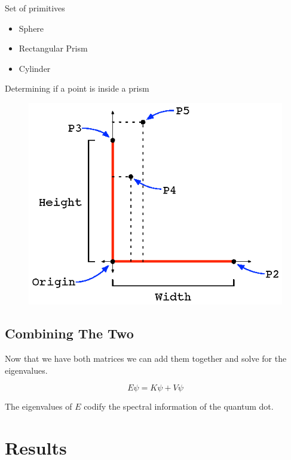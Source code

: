 \documentclass{beamer}
\begin{document}
\begin{frame}
  Set of primitives
    \begin{itemize}
      \item Sphere
      \item Rectangular Prism
      \item Cylinder
    \end{itemize}
\end{frame}

\begin{frame}
Determining if a point is inside a prism
\begin{figure}[h!]
  \centering
  \includegraphics[scale=1.2]{figures/recPrism.eps}
\end{figure}
\end{frame}

\subsection{Combining The Two}
\begin{frame}
Now that we have both matrices we can add them together and solve for the eigenvalues.

$$E\psi = K \psi + V \psi$$

The eigenvalues of $E$ codify the spectral information of the quantum dot. 
\end{frame}

\section{Results}
\end{document}
